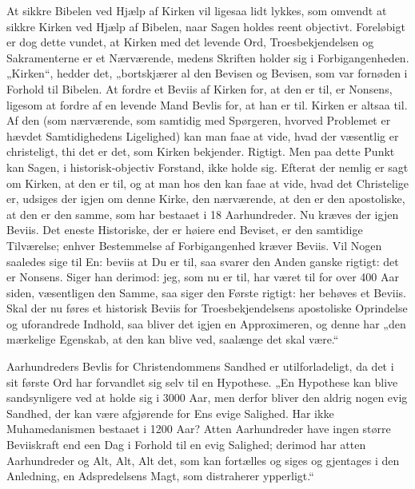 At sikkre Bibelen ved Hjælp af Kirken vil ligesaa lidt lykkes, som
omvendt at sikkre Kirken ved Hjælp af Bibelen, naar Sagen holdes
reent objectivt. Foreløbigt er dog dette vundet, at Kirken med det
levende Ord, Troesbekjendelsen og Sakramenterne er et Nærværende,
medens Skriften holder sig i Forbigangenheden. „Kirken“, hedder
det, „bortskjærer al den Bevisen og Bevisen,%
{} som var fornøden i Forhold til Bibelen. At fordre et Beviis af
Kirken for, at den er til, er Nonsens, ligesom at fordre af en
levende Mand Bevlis for, at han er til. Kirken er altsaa til. Af
den (som nærværende, som samtidig med Spørgeren, hvorved
Problemet er hævdet Samtidighedens Ligelighed) kan man faae at
vide, hvad der væsentlig er christeligt, thi det er det, som
Kirken bekjender. Rigtigt. Men paa dette Punkt kan Sagen, i
historisk-objectiv Forstand, ikke holde sig. Efterat der nemlig er
sagt om Kirken, at den er til, og at man hos den kan faae at vide,
hvad det Christelige er, udsiges der igjen om denne Kirke, den
nærværende, at den er den apostoliske, at den er den samme, som
har bestaaet i 18 Aarhundreder. Nu kræves der igjen Beviis. Det
eneste Historiske, der er høiere end Beviset, er den samtidige
Tilværelse; enhver Bestemmelse af Forbigangenhed kræver Beviis.
Vil Nogen saaledes sige til En: beviis at Du er til, saa
 svarer den Anden ganske rigtigt: det er Nonsens. Siger han
derimod: jeg, som nu er til, har været til for over 400 Aar siden,
væsentligen den Samme, saa siger den Første rigtigt: her behøves
et Beviis. Skal der nu føres et historisk Beviis for
Troesbekjendelsens apostoliske Oprindelse og uforandrede Indhold,
saa bliver det igjen en Approximeren, og denne har „den mærkelige
Egenskab, at den kan blive ved, saalænge det skal være.“

Aarhundreders Bevlis for Christendommens Sandhed er
utilforladeligt, da det i sit første Ord har forvandlet sig selv
til en Hypothese. „En Hypothese kan blive sandsynligere ved at
holde sig i 3000 Aar, men derfor bliver den aldrig nogen evig
Sandhed, der kan være afgjørende for Ens evige Salighed. Har ikke
Muhamedanismen bestaaet i 1200 Aar? Atten Aarhundreder have ingen
større Beviiskraft end een Dag i Forhold til en evig Salighed;
derimod har atten Aarhundreder og Alt, Alt, Alt det, som kan
fortælles og siges og gjentages i den Anledning, en Adspredelsens
Magt, som distraherer ypperligt.“

